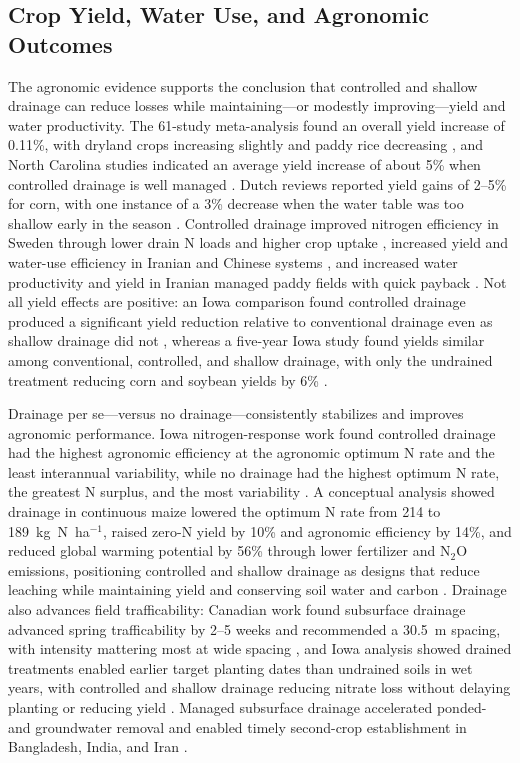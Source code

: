 \documentclass[11pt]{article}
\begin{document}
\subsection{Crop Yield, Water Use, and Agronomic Outcomes}

The agronomic evidence supports the conclusion that controlled and shallow
drainage can reduce losses while maintaining---or modestly improving---yield and
water productivity. The 61-study meta-analysis found an overall yield increase of
0.11\%, with dryland crops increasing slightly and paddy rice decreasing
\parencite{Wang2020c}, and North Carolina studies indicated an average yield
increase of about 5\% when controlled drainage is well managed
\parencite{Strock2011}. Dutch reviews reported yield gains of 2--5\% for corn,
with one instance of a 3\% decrease when the water table was too shallow early
in the season \parencite{deWit2022}. Controlled drainage improved nitrogen
efficiency in Sweden through lower drain N loads and higher crop uptake
\parencite{Wesström2007}, increased yield and water-use efficiency in Iranian
and Chinese systems \parencite{Jouni2018,Dou2021,Dou2023}, and increased water
productivity and yield in Iranian managed paddy fields with quick payback
\parencite{DarziNaftchali2018b}. Not all yield effects are positive: an Iowa
comparison found controlled drainage produced a significant yield reduction
relative to conventional drainage even as shallow drainage did not
\parencite{Helmers2012}, whereas a five-year Iowa study found yields similar
among conventional, controlled, and shallow drainage, with only the undrained
treatment reducing corn and soybean yields by 6\% \parencite{Schott2017}.

Drainage per se---versus no drainage---consistently stabilizes and improves
agronomic performance. Iowa nitrogen-response work found controlled drainage had
the highest agronomic efficiency at the agronomic optimum N rate and the least
interannual variability, while no drainage had the highest optimum N rate, the
greatest N surplus, and the most variability \parencite{Maas2022}. A conceptual
analysis showed drainage in continuous maize lowered the optimum N rate from 214
to 189~kg~N~ha$^{-1}$, raised zero-N yield by 10\% and agronomic efficiency by
14\%, and reduced global warming potential by 56\% through lower fertilizer and
N$_2$O emissions, positioning controlled and shallow drainage as designs that
reduce leaching while maintaining yield and conserving soil water and carbon
\parencite{Castellano2019}. Drainage also advances field trafficability: Canadian
work found subsurface drainage advanced spring trafficability by 2--5 weeks and
recommended a 30.5~m spacing, with intensity mattering most at wide spacing
\parencite{PAUL1983}, and Iowa analysis showed drained treatments enabled earlier
target planting dates than undrained soils in wet years, with controlled and
shallow drainage reducing nitrate loss without delaying planting or reducing
yield \parencite{Schott2017b}. Managed subsurface drainage accelerated ponded-
and groundwater removal and enabled timely second-crop establishment in
Bangladesh, India, and Iran \parencite{Okwany2016,Prathapar2018,Rahimi2024}.
\end{document}
